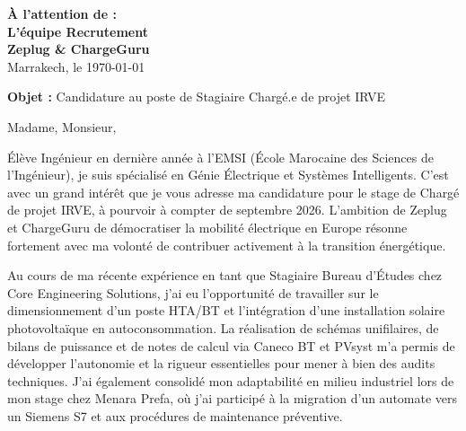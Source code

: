 \documentclass[10pt,a4paper]{../../altacv}
\makeatletter
\renewcommand{\makecvheader}{%
  \begingroup
    \raggedright\color{emphasis}%
    {\Huge\bfseries\MakeUppercase{\@name}\par}
    \medskip
    {\large\bfseries\color{accent}\@tagline\par}
    \medskip
    {\footnotesize\bfseries\@personalinfo\par}
  \endgroup\medskip
}
\makeatother
\begin{document}

\makecvheader

\bigskip
\medskip

\begin{flushright}
  {\color{emphasis}\textbf{À l'attention de :}} \\[2pt]
  \textbf{L'équipe Recrutement} \\
  \textbf{Zeplug \& ChargeGuru} \\[20pt]
  Marrakech, le \today
\end{flushright}
\bigskip

\bigskip

{\color{accent}\textbf{Objet :}} Candidature au poste de Stagiaire Chargé.e de projet IRVE

\bigskip\bigskip

Madame, Monsieur,

\vspace{0.4cm}

Élève Ingénieur en dernière année à l'EMSI (École Marocaine des Sciences de l'Ingénieur), je suis spécialisé en Génie Électrique et Systèmes Intelligents. C'est avec un grand intérêt que je vous adresse ma candidature pour le stage de Chargé de projet IRVE, à pourvoir à compter de septembre 2026. L'ambition de Zeplug et ChargeGuru de démocratiser la mobilité électrique en Europe résonne fortement avec ma volonté de contribuer activement à la transition énergétique.

\vspace{0.4cm}

Au cours de ma récente expérience en tant que Stagiaire Bureau d'Études chez Core Engineering Solutions, j'ai eu l'opportunité de travailler sur le dimensionnement d'un poste HTA/BT et l'intégration d'une installation solaire photovoltaïque en autoconsommation. La réalisation de schémas unifilaires, de bilans de puissance et de notes de calcul via Caneco BT et PVsyst m'a permis de développer l'autonomie et la rigueur essentielles pour mener à bien des audits techniques. J'ai également consolidé mon adaptabilité en milieu industriel lors de mon stage chez Menara Prefa, où j'ai participé à la migration d'un automate vers un Siemens S7 et aux procédures de maintenance préventive.
\end{document}
